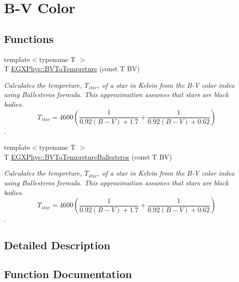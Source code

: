 \hypertarget{group___e_g_x_phys-_b-_v_color}{}\section{B-\/V Color}
\label{group___e_g_x_phys-_b-_v_color}
\subsection*{Functions}
\begin{DoxyCompactItemize}
\item 
{\footnotesize template$<$typename T $>$ }\\T \mbox{\hyperlink{group___e_g_x_phys-_b-_v_color_ga11cf848625fe052fe9250ce2aa22253b}{E\+G\+X\+Phys\+::\+B\+V\+To\+Tempreture}} (const T BV)
\begin{DoxyCompactList}\small\item\em Calculates the tempreture, $T_{star}$, of a star in Kelvin from the B-\/V color index using Ballesteros\textquotesingle{} formula. This approximation assumes that stars are black bodies. \[T_{star}=4600 \left ( \frac{1}{0.92 (B-V)+ 1.7} + \frac{1}{0.92 (B-V) + 0.62} \right )\]. \end{DoxyCompactList}\item 
{\footnotesize template$<$typename T $>$ }\\T \mbox{\hyperlink{group___e_g_x_phys-_b-_v_color_gacefbc01847cd5fac2bbf132937392fd1}{E\+G\+X\+Phys\+::\+B\+V\+To\+Tempreture\+Ballesteros}} (const T BV)
\begin{DoxyCompactList}\small\item\em Calculates the tempreture, $T_{star}$, of a star in Kelvin from the B-\/V color index using Ballesteros\textquotesingle{} formula. This approximation assumes that stars are black bodies. \[T_{star}=4600 \left ( \frac{1}{0.92 (B-V)+ 1.7} + \frac{1}{0.92 (B-V) + 0.62} \right )\]. \end{DoxyCompactList}\end{DoxyCompactItemize}


\subsection{Detailed Description}


\subsection{Function Documentation}
\mbox{\label{group___e_g_x_phys-_b-_v_color_ga11cf848625fe052fe9250ce2aa22253b}} 
